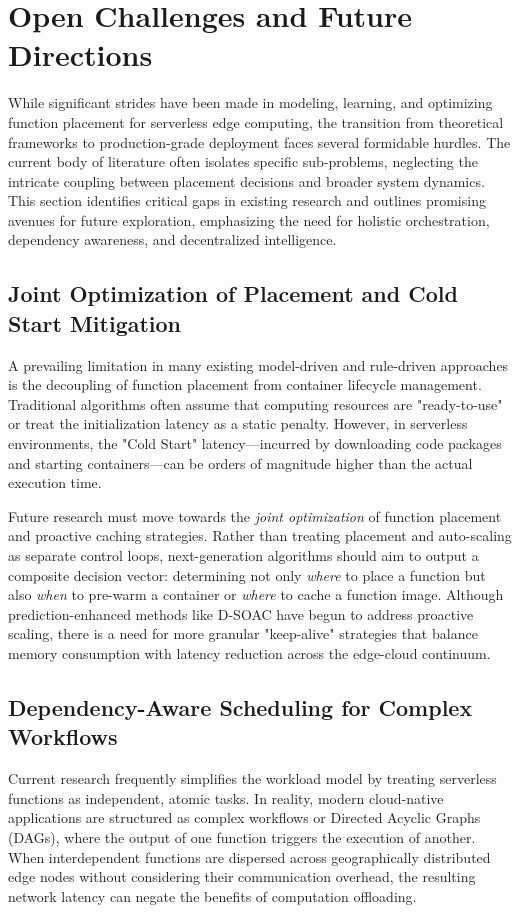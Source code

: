 \documentclass[lettersize,journal]{IEEEtran}
\begin{document}
\section{Open Challenges and Future Directions}
\label{sec:challenges}

While significant strides have been made in modeling, learning, and optimizing function placement for serverless edge computing, the transition from theoretical frameworks to production-grade deployment faces several formidable hurdles. The current body of literature often isolates specific sub-problems, neglecting the intricate coupling between placement decisions and broader system dynamics. This section identifies critical gaps in existing research and outlines promising avenues for future exploration, emphasizing the need for holistic orchestration, dependency awareness, and decentralized intelligence.

\subsection{Joint Optimization of Placement and Cold Start Mitigation}
A prevailing limitation in many existing model-driven and rule-driven approaches is the decoupling of function placement from container lifecycle management. Traditional algorithms often assume that computing resources are "ready-to-use" or treat the initialization latency as a static penalty. However, in serverless environments, the "Cold Start" latency—incurred by downloading code packages and starting containers—can be orders of magnitude higher than the actual execution time. 

Future research must move towards the \textit{joint optimization} of function placement and proactive caching strategies. Rather than treating placement and auto-scaling as separate control loops, next-generation algorithms should aim to output a composite decision vector: determining not only \textit{where} to place a function but also \textit{when} to pre-warm a container or \textit{where} to cache a function image. Although prediction-enhanced methods like D-SOAC have begun to address proactive scaling, there is a need for more granular "keep-alive" strategies that balance memory consumption with latency reduction across the edge-cloud continuum.

\subsection{Dependency-Aware Scheduling for Complex Workflows}
Current research frequently simplifies the workload model by treating serverless functions as independent, atomic tasks. In reality, modern cloud-native applications are structured as complex workflows or Directed Acyclic Graphs (DAGs), where the output of one function triggers the execution of another. When interdependent functions are dispersed across geographically distributed edge nodes without considering their communication overhead, the resulting network latency can negate the benefits of computation offloading.
\end{document}
